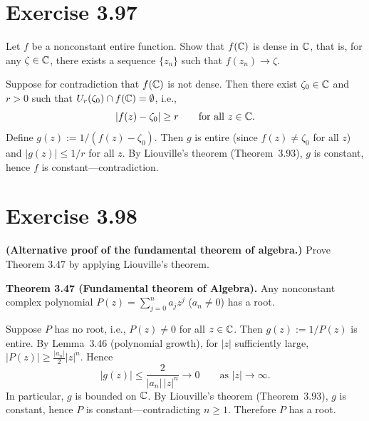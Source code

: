 \documentclass{article}
\begin{document}
\section{Exercise 3.97}

Let $f$ be a nonconstant entire function. Show that $f(\mathbb{C})$ is
dense in $\mathbb{C}$, that is, for any $\zeta \in \mathbb{C}$, there exists a
sequence $\{z_n\}$ such that $f(z_n) \to \zeta$.

\begin{solution}
  Suppose for contradiction that $f(\mathbb{C})$ is not dense.
  Then there exist $\zeta_0 \in \mathbb{C}$ and $r > 0$ such that
  $U_r(\zeta_0) \cap f(\mathbb{C}) = \emptyset$, i.e.,
  \[
    |f(z) - \zeta_0| \ge r
    \qquad\text{for all } z \in \mathbb{C}.
  \]
  Define $g(z) := 1/(f(z) - \zeta_0)$.
  Then $g$ is entire (since $f(z) \ne \zeta_0$ for all $z$) and
  $|g(z)| \le 1/r$ for all $z$.
  By Liouville's theorem (Theorem~3.93), $g$ is constant,
  hence $f$ is constant---contradiction.\qedhere
\end{solution}

\section{Exercise 3.98}

\textbf{(Alternative proof of the fundamental theorem of algebra.)}
Prove Theorem 3.47 by applying Liouville's theorem.

\textbf{Theorem 3.47 (Fundamental theorem of Algebra).}
Any nonconstant complex polynomial
$P(z) = \sum_{j=0}^{n} a_j z^j$ ($a_n \ne 0$) has a root.

\begin{solution}
  Suppose $P$ has no root, i.e., $P(z) \ne 0$ for all $z \in \mathbb{C}$.
  Then $g(z) := 1/P(z)$ is entire.
  By Lemma~3.46 (polynomial growth), for $|z|$ sufficiently
  large, $|P(z)| \ge \frac{|a_n|}{2}|z|^n$.
  Hence
  \[
    |g(z)| \le \frac{2}{|a_n|\,|z|^n} \to 0
    \qquad\text{as } |z| \to \infty.
  \]
  In particular, $g$ is bounded on $\mathbb{C}$.
  By Liouville's theorem (Theorem~3.93), $g$ is constant,
  hence $P$ is constant---contradicting $n \ge 1$.
  Therefore $P$ has a root.\qedhere
\end{solution}
\end{document}
